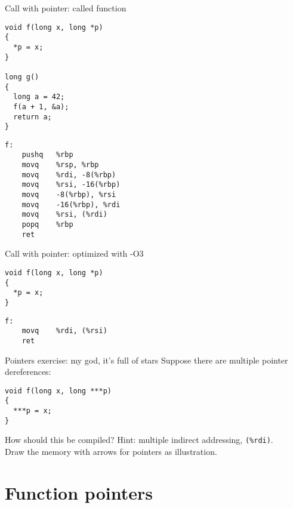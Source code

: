 \documentclass[landscape]{beamer}
\begin{document}
\begin{frame}[fragile]{Call with pointer: called function}
\begin{minipage}{.5\textwidth}
\begin{verbatim}
void f(long x, long *p)
{
  *p = x;
}

long g()
{
  long a = 42;
  f(a + 1, &a);
  return a;
}
\end{verbatim}
\end{minipage}
%
\begin{minipage}{.4\textwidth}
\begin{verbatim}
f:  
	pushq	%rbp
	movq	%rsp, %rbp
	movq	%rdi, -8(%rbp)
	movq	%rsi, -16(%rbp)
	movq	-8(%rbp), %rsi
	movq	-16(%rbp), %rdi
	movq	%rsi, (%rdi)
	popq	%rbp
	ret
\end{verbatim}
\end{minipage}
\end{frame}

\begin{frame}[fragile]{Call with pointer: optimized with -O3}
\begin{minipage}{.5\textwidth}
\begin{verbatim}
void f(long x, long *p)
{
  *p = x;
}

\end{verbatim}
\end{minipage}
%
\begin{minipage}{.4\textwidth}
\begin{verbatim}
f:  
	movq	%rdi, (%rsi)
	ret
\end{verbatim}
\end{minipage}
\end{frame}

\begin{frame}[fragile]{Pointers exercise: my god, it's full of stars}
Suppose there are multiple pointer dereferences:

\begin{verbatim}
void f(long x, long ***p)
{
  ***p = x;
}

\end{verbatim}

How should this be compiled? Hint: multiple indirect addressing, \texttt{(\%rdi)}.
\\
Draw the memory with arrows for pointers as illustration.
\end{frame}

\section{Function pointers}
\end{document}
